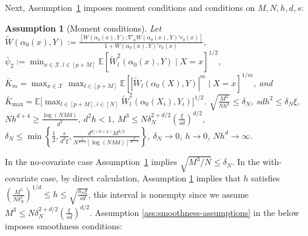 \documentclass[11pt]{article}
\newtheorem{assumption}{Assumption}
\begin{document}
Next, Assumption~\ref{ass:moment-assumptions} imposes moment conditions and conditions on $M,N,h,d,s$:
\begin{assumption}[Moment conditions]\label{ass:moment-assumptions}
Let $\displaystyle\widetilde W(\alpha_0(x),Y)\!\!:=\!\!\frac{[\! W(\alpha_0(x),Y) ;\!\nabla_\alpha W(\alpha_0(x),Y)'r_0(x) ]}{1+W(\alpha_0(x),Y)'r_0(x)}$, $\bar \psi_2 := {\displaystyle \min_{x\in \mathcal{X}, l\in [p+M]}} \mathbb{E}[ \widetilde W_{l}^2(\alpha_0(x),Y)\mid X=x]^{1/2},$ $\bar K_m = {\displaystyle\max_{x\in \mathcal{X}}\max_{l\in [p+M]}}\mathbb{E}[|\widetilde W_{l}(\alpha_0(X),Y)|^m\mid X=x]^{1/m}$, and $\bar K_{\max} = \mathbb{E}\big[ {\displaystyle\max_{l\in [p+M], i \in [N]}}\widetilde W_{l}^2(\alpha_0(X_i),Y_i)\big]^{1/2}$. $\sqrt{\frac{M^3}{Nh^d}}\leq\delta_N$, $sdh^2\leq\delta_N\xi$, $Nh^{d+4}\geq\frac{\log(NMd)}{d^2}$, $d^2h<1$, $M^3\leq N\delta_N^{2+d/2}\left(\frac{\xi}{sd}\right)^{d/2}$, $\delta_N\leq\min\left\{\frac{1}{2},\frac{s}{d^3\xi},\frac{d^{d/(d+4)}M^{3/2}}{N^{\frac{2}{d+4}}[\log(NMd)]^{\frac{d}{2d+8}}}\right\}$, $\delta_N\rightarrow0$, $h\rightarrow0$, $Nh^d\rightarrow\infty$.
\end{assumption}
In the no-covariate case Assumption~\ref{ass:moment-assumptions} implies $\sqrt{M^3/N}\leq\delta_N$. In the with-covariate case, by direct calculation, Assumption \ref{ass:moment-assumptions} implies that $h$ satisfies $\left(\frac{M^3}{N\delta_N^2}\right)^{1/d}\leq h\leq\sqrt{\frac{\delta_N\xi}{sd}}$, this interval is nonempty since we assume $M^3\leq N\delta_N^{2+d/2}\left(\frac{\xi}{sd}\right)^{d/2}$.  Assumption \ref{ass:smoothness-assumptions} in the below imposes smoothness conditions:
\end{document}
